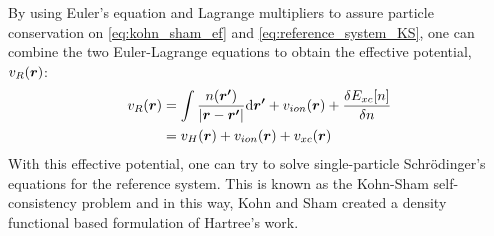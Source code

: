 By using Euler's equation and Lagrange multipliers to assure particle conservation on \eqref{eq:kohn_sham_ef} and \eqref{eq:reference_system_KS}, one can combine the two Euler-Lagrange equations to obtain the effective potential, $v_R \qty(\bm{r})$:
\begin{equation}\label{eq:CombiningEuler}
\begin{split} 
v_R \qty(\bm{r}) &= \int \dfrac{n \qty(\bm{r'})}{\abs{\bm{r}-\bm{r'}}} \mathrm{d}\bm{r'} + v_{ion} \qty(\bm{r}) + \dfrac{\delta E_{xc} \qty[n]}{\delta n } \\
&= v_H \qty(\bm{r}) + v_{ion} \qty(\bm{r}) + v_{xc} \qty(\bm{r})
\end{split}
\end{equation}
With this effective potential, one can try to solve single-particle Schrödinger's equations for the reference system. This is known as the Kohn-Sham self-consistency problem and in this way, Kohn and Sham created a density functional based formulation of Hartree's  work.

